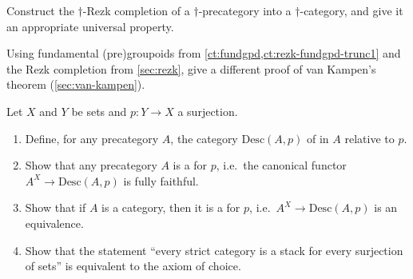 \begin{ex}\label{ex:dagger-rezk}
  Construct the $\dagger$-Rezk completion of a $\dagger$-precategory into a $\dagger$-category, and give it an appropriate universal property.
\end{ex}

\begin{ex}\label{ex:rezk-vankampen}
  Using fundamental (pre)groupoids from \cref{ct:fundgpd,ct:rezk-fundgpd-trunc1} and the Rezk completion from \cref{sec:rezk}, give a different proof of van Kampen's theorem (\cref{sec:van-kampen}).
\end{ex}

\begin{ex}\label{ex:stack}
  Let $X$ and $Y$ be sets and $p:Y\to X$ a surjection.
  \begin{enumerate}
  \item Define, for any precategory $A$, the category $\mathrm{Desc}(A,p)$ of 
    in $A$ relative to $p$.
  \item Show that any precategory $A$ is a 
    for $p$, i.e.\ the canonical functor $A^X \to \mathrm{Desc}(A,p)$ is fully faithful.
  \item Show that if $A$ is a category, then it is a 
    for $p$, i.e.\ $A^X \to \mathrm{Desc}(A,p)$ is an equivalence.
  \item Show that the statement ``every strict category is a stack for every surjection of sets'' is equivalent to the axiom of choice.
  \end{enumerate}
\end{ex}

